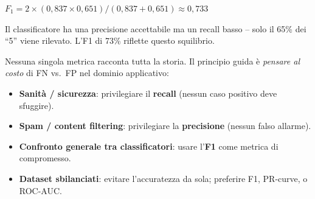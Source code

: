 \begin{exbox}
$F_1 = 2 \times (0{,}837 \times 0{,}651) / (0{,}837 + 0{,}651) \approx 0{,}733$

Il classificatore ha una precisione accettabile ma un recall basso -- solo il 65\% dei ``5'' viene rilevato. L'F1 di 73\% riflette questo squilibrio.
\end{exbox}

\begin{thmbox}
Nessuna singola metrica racconta tutta la storia. Il principio guida è \emph{pensare al costo} di FN vs.\ FP nel dominio applicativo:
\begin{itemize}
    \item \textbf{Sanità / sicurezza}: privilegiare il \textbf{recall} (nessun caso positivo deve sfuggire).
    \item \textbf{Spam / content filtering}: privilegiare la \textbf{precisione} (nessun falso allarme).
    \item \textbf{Confronto generale tra classificatori}: usare l'\textbf{F1} come metrica di compromesso.
    \item \textbf{Dataset sbilanciati}: evitare l'accuratezza da sola; preferire F1, PR-curve, o ROC-AUC.
\end{itemize}
\end{thmbox}